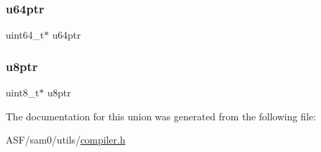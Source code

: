 \mbox{\label{union_union_ptr_a01a7db75ae97caa7457038b8ee801d1f}} 
\subsubsection{\texorpdfstring{u64ptr}{u64ptr}}
{\footnotesize\ttfamily uint64\+\_\+t$\ast$ u64ptr}

\mbox{\label{union_union_ptr_acc04e057a962c975bbdf62664c52ff2c}} 
\subsubsection{\texorpdfstring{u8ptr}{u8ptr}}
{\footnotesize\ttfamily uint8\+\_\+t$\ast$ u8ptr}



The documentation for this union was generated from the following file\+:\begin{DoxyCompactItemize}
\item 
A\+S\+F/sam0/utils/\mbox{\hyperlink{compiler_8h}{compiler.\+h}}\end{DoxyCompactItemize}
